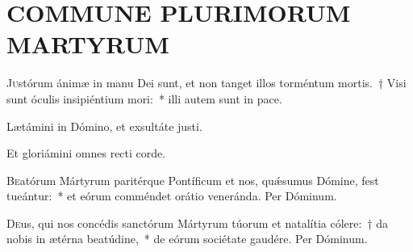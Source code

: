 \documentclass[vesperale_romanum.tex]{subfiles}
\begin{document}
\section[Commune Plurimorum Martyrum extra Temp. Paschale]{COMMUNE PLURIMORUM MARTYRUM}

{} %










\lettrine{J}{u}stórum ánimæ in manu Dei sunt, et non tanget illos torméntum mortis.~† Visi sunt óculis insipiéntium mori:~* illi autem sunt in pace.
%


\altertonus


\vv Lætámini in Dómino, et exsultáte justi.

\rr Et gloriámini omnes recti corde.
%
\admagnificat
%
%

\lettrine{B}{e}atórum Mártyrum paritérque Pontíficum \nomen{} et \nomen{} nos, quǽsumus Dómine, fest tueántur:~* et eórum comméndet orátio veneránda. Per Dóminum.


\lettrine{D}{e}us, qui nos concédis sanctórum Mártyrum túorum \nomen{} et \nomen{} natalítia cólere:~† da nobis in ætérna beatúdine,~* de eórum sociétate gaudére. Per Dóminum.
\end{document}
